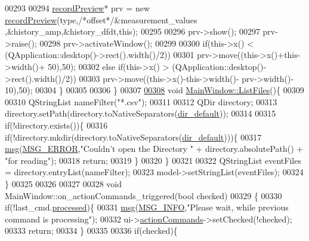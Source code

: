 \begin{DoxyCode}
00293 
00294         \hyperlink{a00073}{recordPreview}* prv = \textcolor{keyword}{new} \hyperlink{a00073}{recordPreview}(type,\textcolor{comment}{/*offset*/}&measurement\_values
      ,&history\_amp,&history\_dfdt,\textcolor{keyword}{this});
00295 
00296         prv->show();
00297         prv->raise();
00298         prv->activateWindow();
00299 
00300         \textcolor{keywordflow}{if}(this->x() < (QApplication::desktop()->rect().width()/2))
00301         prv->move((this->x()+this->width()+ 50),50);
00302         \textcolor{keywordflow}{else} \textcolor{keywordflow}{if}(this->x() > (QApplication::desktop()->rect().width()/2))
00303         prv->move((this->x()-this->width()- prv->width()- 10),50);
00304        \}
00305 
00306 \}
00307 
\hypertarget{a00109_source_l00308}{}\hyperlink{a00017_a61e2ba77e381cae572eec854b6510b81}{00308} \textcolor{keywordtype}{void} \hyperlink{a00017_a61e2ba77e381cae572eec854b6510b81}{MainWindow::ListFiles}()\{
00309 
00310     QStringList nameFilter(\textcolor{stringliteral}{"*.csv"});
00311 
00312     QDir directory;
00313     directory.setPath(directory.toNativeSeparators(\hyperlink{a00017_a2e107e43aeaccaf4c9a42254f13122c8}{dir\_default}));
00314 
00315     \textcolor{keywordflow}{if}(!directory.exists())\{
00316         \textcolor{keywordflow}{if}(!directory.mkdir(directory.toNativeSeparators(\hyperlink{a00017_a2e107e43aeaccaf4c9a42254f13122c8}{dir\_default})))\{
00317             \hyperlink{a00017_a6134b74dbfffbaf333e169bd09597b53}{msg}(\hyperlink{a00090_aa8a990825a5a62c89d2fb8b08d8a1070}{MSG\_ERROR},\textcolor{stringliteral}{"Couldn't open the Directory "} + directory.absolutePath() + \textcolor{stringliteral}{"for
       reading"});
00318         \textcolor{keywordflow}{return};
00319         \}
00320     \}
00321 
00322     QStringList eventFiles = directory.entryList(nameFilter);
00323     model->setStringList(eventFiles);
00324 \}
00325 
00326 
00327 
00328 \textcolor{keywordtype}{void} MainWindow::on\_actionCommands\_triggered(\textcolor{keywordtype}{bool} checked)
00329 \{
00330     \textcolor{keywordflow}{if}(!last\_cmd.\hyperlink{a00004_a3e88f779da9798a5da7dda227e2ca388}{processed})\{
00331         \hyperlink{a00017_a6134b74dbfffbaf333e169bd09597b53}{msg}(\hyperlink{a00090_a1ddcc97224a95cec04b38b0ac866fa19}{MSG\_INFO},\textcolor{stringliteral}{"Please wait, while previous command is processing"});
00332         ui->\hyperlink{a00080_a3dccdc21d3df68b86550093b5e3c0356}{actionCommands}->setChecked(!checked);
00333         \textcolor{keywordflow}{return};
00334     \}
00335 
00336     \textcolor{keywordflow}{if}(checked)\{

\end{DoxyCode}
